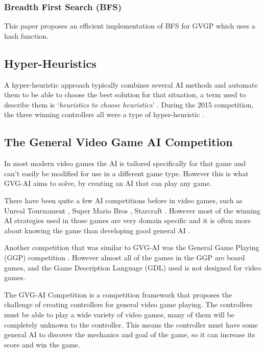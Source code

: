 \documentclass[journal]{IEEEtran}
\begin{document}
		
		
		\subsubsection{Breadth First Search (BFS) }\label{sssec:BFS}
			This paper proposes an efficient implementation of BFS for GVGP \cite{EfficientBFS} which uses a hash function.

	\subsection{Hyper-Heuristics}
		A hyper-heuristic approach typically combines several AI methods and automate them to be able to choose the best solution for that situation, a term used to describe them is `\textit{heuristics to choose heuristics}' \cite{burke2013hyper, burke2010classification}.
		During the 2015 competition, the three winning controllers all were a type of hyper-heuristic \cite{horn2016mcts}.
		
		

			
		
		

	\subsection{The General Video Game AI Competition} \label{ssec:GVGAIC}
	
		In most modern video games the AI is tailored specifically for that game and can't easily be modified for use in a different game type. However this is what GVG-AI aims to solve, by creating an AI that can play any game. 
		
		There have been quite a few AI competitions before in video games, such as Unreal Tournament \cite{hingston2010new}, Super Mario Bros \cite{shaker2013turing}, Starcraft \cite{ontanon2013survey}. 
		However most of the winning AI strategies used in those games are very domain specific and it is often more about knowing the game than developing good general AI \cite{perez20162014}. 
		 \par
		
		
		Another competition that was similar to GVG-AI was the General Game Playing (GGP) competition \cite{GGP2005general, love2008general}. However almost all of the games in the GGP are board games, and the Game Description Language (GDL) used is not designed for video games.
		
		The GVG-AI Competition is a competition framework that proposes the challenge of creating controllers for general video game playing. The controllers must be able to play a wide variety of video games, many of them will be completely unknown to the controller. This means the controller must have some general AI to discover the mechanics and goal of the game, so it can increase its score and win the game. \cite{GVGAI, perez20162014}
		
\end{document}
